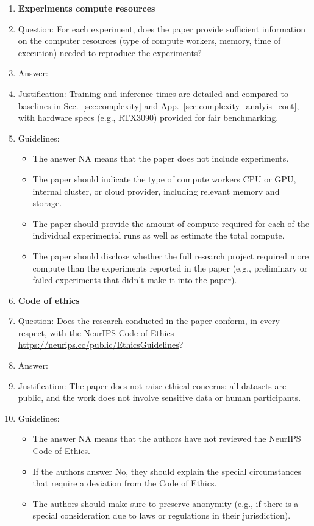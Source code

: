 \documentclass{article}
\theoremstyle{plain}
\theoremstyle{definition}
\theoremstyle{remark}
\begin{document}
{\begin{enumerate}
\item {\bf Experiments compute resources}
    \item[] Question: For each experiment, does the paper provide sufficient information on the computer resources (type of compute workers, memory, time of execution) needed to reproduce the experiments?
    \item[] Answer: \answerYes{}
    \item[] Justification: Training and inference times are detailed and compared to baselines in Sec.~\ref{sec:complexity} and App.~\ref{sec:complexity_analyis_cont}, with hardware specs (e.g., RTX3090) provided for fair benchmarking.
    \item[] Guidelines:
    \begin{itemize}
        \item The answer NA means that the paper does not include experiments.
        \item The paper should indicate the type of compute workers CPU or GPU, internal cluster, or cloud provider, including relevant memory and storage.
        \item The paper should provide the amount of compute required for each of the individual experimental runs as well as estimate the total compute. 
        \item The paper should disclose whether the full research project required more compute than the experiments reported in the paper (e.g., preliminary or failed experiments that didn't make it into the paper). 
    \end{itemize}
    
\item {\bf Code of ethics}
    \item[] Question: Does the research conducted in the paper conform, in every respect, with the NeurIPS Code of Ethics \url{https://neurips.cc/public/EthicsGuidelines}?
    \item[] Answer: \answerYes{}
    \item[] Justification: The paper does not raise ethical concerns; all datasets are public, and the work does not involve sensitive data or human participants.
    \item[] Guidelines:
    \begin{itemize}
        \item The answer NA means that the authors have not reviewed the NeurIPS Code of Ethics.
        \item If the authors answer No, they should explain the special circumstances that require a deviation from the Code of Ethics.
        \item The authors should make sure to preserve anonymity (e.g., if there is a special consideration due to laws or regulations in their jurisdiction).
    \end{itemize}



\end{enumerate}}
\end{document}
